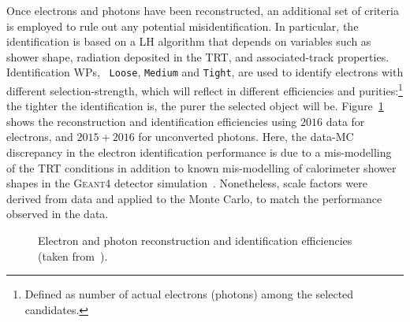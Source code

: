 			Once electrons and photons have been reconstructed, an additional set of criteria is employed to rule out any potential misidentification. In particular, the identification is based on a \ac{LH} algorithm that depends on variables such as shower shape, radiation deposited in the \ac{TRT}, and associated-track properties. Identification \acp{WP}, \ie\ \texttt{Loose}, \texttt{Medium} and \texttt{Tight}, are used to identify electrons with different selection-strength, which will reflect in different efficiencies and purities:\footnote{Defined as number of actual electrons (photons) among the selected candidates.} the tighter the identification is, the purer the selected object will be. Figure~\ref{fig:ElPhIDEff} shows the reconstruction and identification efficiencies using $2016$ data for electrons, and $2015+2016$ for unconverted photons. Here, the data-\ac{MC} discrepancy in the electron identification performance is due to a mis-modelling of the \ac{TRT} conditions in addition to known mis-modelling of calorimeter shower shapes in the \textsc{Geant4} detector simulation~\cite{PubEGAMMA}. Nonetheless, scale factors were derived from data and applied to the Monte Carlo, to match the performance observed in the data.

			\begin{figure}[!htb]
				\begin{center}
					\hspace{0.05\textwidth}
				\end{center}
				\caption{Electron and photon reconstruction and identification efficiencies (taken from~\cite{PubEGAMMA}).}
				\label{fig:ElPhIDEff}
			\end{figure}

